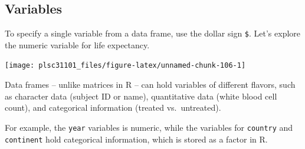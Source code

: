 \documentclass[
]{book}
\newenvironment{Shaded}{\begin{snugshade}}{\end{snugshade}}
\newcommand{\CommentTok}[1]{\textcolor[rgb]{0.56,0.35,0.01}{\textit{#1}}}
\newcommand{\KeywordTok}[1]{\textcolor[rgb]{0.13,0.29,0.53}{\textbf{#1}}}
\newcommand{\NormalTok}[1]{#1}
\newcommand{\OperatorTok}[1]{\textcolor[rgb]{0.81,0.36,0.00}{\textbf{#1}}}
\begin{document}
\hypertarget{variables-1}{%
\subsection{Variables}\label{variables-1}}

To specify a single variable from a data frame, use the dollar sign \texttt{\$}. Let's explore the numeric variable for life expectancy.

\begin{Shaded}
\end{Shaded}

\begin{center}\texttt{[image: plsc31101\_files/figure-latex/unnamed-chunk-106-1]} \end{center}

Data frames -- unlike matrices in R -- can hold variables of different flavors, such as character data (subject ID or name), quantitative data (white blood cell count), and categorical information (treated vs.~untreated).

For example, the \texttt{year} variables is numeric, while the variables for \texttt{country} and \texttt{continent} hold categorical information, which is stored as a factor in R.
\end{document}
